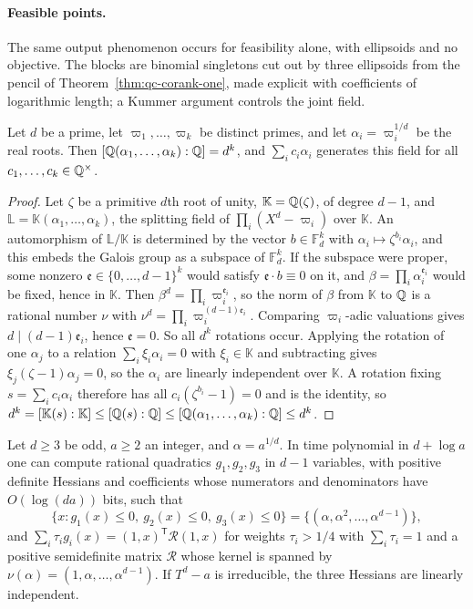 \paragraph{Feasible points.}
The same output phenomenon occurs for feasibility alone, with ellipsoids and
no objective. The blocks are binomial singletons cut out by three ellipsoids
from the pencil of Theorem~\ref{thm:qc-corank-one}, made explicit with
coefficients of logarithmic length; a Kummer argument controls the joint field.

\begin{lemma}
\label{lem:qc-kummer}
Let $d$ be a prime, let $\varpi_1,\ldots,\varpi_k$ be distinct primes, and let
$\alpha_i=\varpi_i^{1/d}$ be the real roots. Then
$[\mathbb Q(\alpha_1,\ldots,\alpha_k):\mathbb Q]=d^k$, and $\sum_ic_i\alpha_i$ generates this
field for all $c_1,\ldots,c_k\in\mathbb Q^\times$.
\end{lemma}

\begin{proof}
Let $\zeta$ be a primitive $d$th root of unity, $\mathbb K=\mathbb Q(\zeta)$, of
degree $d-1$, and $\mathbb L=\mathbb K(\alpha_1,\ldots,\alpha_k)$, the
splitting field of $\prod_i(X^d-\varpi_i)$ over $\mathbb K$. An automorphism
of $\mathbb L/\mathbb K$ is determined by the vector $b\in\mathbb F_d^k$ with
$\alpha_i\mapsto\zeta^{b_i}\alpha_i$, and this embeds the Galois group as a
subspace of $\mathbb F_d^k$. If the subspace were proper, some nonzero
$\mathfrak e\in\{0,\ldots,d-1\}^k$ would satisfy $\mathfrak e\cdot b\equiv0$
on it, and $\beta=\prod_i\alpha_i^{\mathfrak e_i}$ would be fixed, hence in
$\mathbb K$. Then $\beta^d=\prod_i\varpi_i^{\mathfrak e_i}$, so the norm of
$\beta$ from $\mathbb K$ to $\mathbb Q$ is a rational number $\nu$ with
$\nu^d=\prod_i\varpi_i^{(d-1)\mathfrak e_i}$. Comparing $\varpi_i$-adic
valuations gives $d\mid(d-1)\mathfrak e_i$, hence $\mathfrak e=0$. So all $d^k$
rotations occur. Applying the rotation of one $\alpha_j$ to a relation
$\sum_i\xi_i\alpha_i=0$ with $\xi_i\in\mathbb K$ and subtracting gives
$\xi_j(\zeta-1)\alpha_j=0$, so the $\alpha_i$ are linearly independent over
$\mathbb K$. A rotation fixing $s=\sum_ic_i\alpha_i$ therefore has all
$c_i(\zeta^{b_i}-1)=0$ and is the identity, so
$d^k=[\mathbb K(s):\mathbb K]\le[\mathbb Q(s):\mathbb Q]\le[\mathbb Q(\alpha_1,\ldots,\alpha_k):\mathbb Q]
\le d^k$.
\end{proof}

\begin{proposition}
\label{prop:qc-binomial-block}
Let $d\ge3$ be odd, $a\ge2$ an integer, and $\alpha=a^{1/d}$. In time
polynomial in $d+\log a$ one can compute rational quadratics $g_1,g_2,g_3$ in
$d-1$ variables, with positive definite Hessians and coefficients whose
numerators and denominators have $O(\log(da))$ bits, such that
\[
\{x:g_1(x)\le0,\ g_2(x)\le0,\ g_3(x)\le0\}=\{(\alpha,\alpha^2,\ldots,\alpha^{d-1})\},
\]
and $\sum_i\tau_ig_i(x)=(1,x)^{\mathsf T}\mathcal R(1,x)$ for weights
$\tau_i>1/4$ with $\sum_i\tau_i=1$ and a positive semidefinite matrix
$\mathcal R$ whose kernel is spanned by $\nu(\alpha)=(1,\alpha,\ldots,
\alpha^{d-1})$. If $T^d-a$ is irreducible, the three Hessians are linearly
independent.
\end{proposition}


